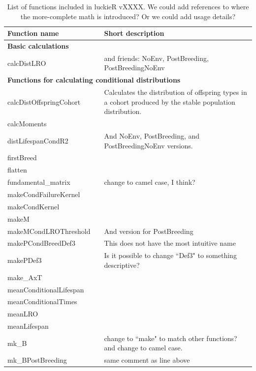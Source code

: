\documentclass[11pt]{article}
\begin{document}
\begin{linenumbers}
\newpage
\begin{table}[ptb]
  \renewcommand{\arraystretch}{1.2}
  \caption{List of functions included in luckieR vXXXX. We could add references to where the more-complete math is introduced? Or we could add usage details?} 
  \label{tab:notation}
  \begin{center}
    \small
    \vspace{-0.2in}
    \begin{tabular}{lp{0.1cm}p{10.5cm}}
      \hline
      \textbf{Function name}& & \textbf{Short description}  \\
      \hline
       \multicolumn{3}{l}{\textbf{Basic calculations}} \\[-3pt]
      calcDistLRO &&  and friends: NoEnv, PostBreeding, PostBreedingNoEnv \\[6pt]
      \multicolumn{3}{l}{\textbf{Functions for calculating conditional distributions}}\\[-3pt]
      calcDistOffspringCohort && Calculates the distribution of offspring types in a cohort produced by the stable population distribution. \\
      calcMoments &&   \\
      distLifespanCondR2 && And NoEnv, PostBreeding, and PostBreedingNoEnv versions. \\
      firstBreed &&   \\
      flatten &&   \\
      fundamental\_matrix &&  change to camel case, I think? \\
      makeCondFailureKernel &&  \\
      makeCondKernel &&  \\
      makeM &&  \\
      makeMCondLROThreshold && And version for PostBreeding \\
      makePCondBreedDef3 && This does not have the most intuitive name \\
      makePDef3 && Is it possible to change ``Def3" to something descriptive? \\
      make\_AxT && \\
      meanConditionalLifespan && \\
      meanConditionalTimes && \\
      meanLRO && \\
      meanLifespan && \\
      mk\_B && change to ``make" to match other functions? and change to camel case. \\
      mk\_BPostBreeding && same comment as line above \\

\end{tabular}
\end{center}
\end{table}
\end{linenumbers}
\end{document}
